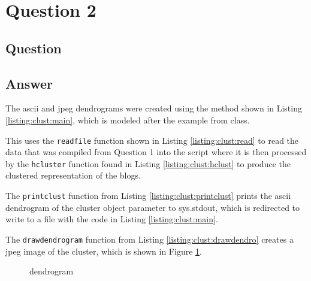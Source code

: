 \section{Question 2}

\subsection{Question}


\subsection{Answer}
The ascii and jpeg dendrograms were created using the method shown in Listing \ref{listing:clust:main}, which is modeled after the example from class. 



This uses the {\tt readfile} function shown in Listing \ref{listing:clust:read} to read the data that was compiled from Question 1 into the script where it is then processed by the {\tt hcluster} function found in Listing \ref{listing:clust:hclust} to produce the clustered representation of the blogs.





The {\tt printclust} function from Listing \ref{listing:clust:printclust} prints the ascii dendrogram of the cluster object parameter to sys.stdout, which is redirected to write to a file with the code in Listing \ref{listing:clust:main}.



The {\tt drawdendrogram} function from Listing \ref{listing:clust:drawdendro} creates a jpeg image of the cluster, which is shown in Figure \ref{fig:clust}.



\begin{figure}[h!]
\centering
{}
\caption{dendrogram}
\label{fig:clust}
\end{figure}